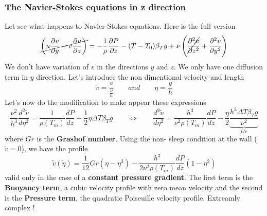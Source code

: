 	\subsubsection{The Navier-Stokes equations in z direction}
		Let see what happens to Navier-Stokes equations. Here is the full version 
		\begin{equation}
			\cancel{\left( u\frac{\D v}{\D y} + v\frac{\D v}{\D z} \right)} = - \frac{1}{\rho} \frac{\D P}{\D z} - (T-T_0)\beta _T g + \nu \left( \cancel{\frac{\D ^2 v}{\D z^2}} + \frac{\D ^2 v}{\D y^2} \right)
		\end{equation}
		We don’t have variation of $v$ in the directions $y$ and $z$. We only have one diffusion term in $y$ direction. Let's introduce the non dimentional velocity and length
		\begin{equation}
			\tilde{v} = \frac{v}{\frac{\nu}{h}} \qquad and \qquad \eta = \frac{y}{h}
		\end{equation}
	 	Let's now do the modification to make appear these expressions
	 	\begin{equation}
	 		\frac{\nu ^2}{h^3} \frac{d^2 \tilde{v}}{d \eta ^2} = \frac{1}{\rho (T_m)} \frac{dP}{dz} - \frac{1}{2} \eta \Delta T \beta _T g \qquad \Leftrightarrow \qquad 
	 		\frac{d^2 \tilde{v}}{d \eta ^2} = \frac{h^3}{\nu ^2\rho (T_m)} \frac{dP}{dz} - \frac{\eta}{2} \underbrace{\frac{h^3 \Delta T \beta _T g}{\nu ^2}}_{Gr}
	 	\end{equation}
		where $Gr$ is the \textbf{Grashof number}. Using the non-		sleep condition at the wall ($\tilde{v} = 0$), we have the 	profile 
		\begin{equation}
			\tilde{v} (\tilde{\eta}) = \frac{1}{12} Gr (\eta - \eta ^3) - \frac{h^3}{2\nu ^2\rho (T_m)} \frac{dP}{dz} (1-\eta ^2)
		\end{equation}
		valid only in the case of a \textbf{constant pressure gradient}. The first term is the \textbf{Buoyancy term}, a cubic velocity profile with zero mean velocity and the second is the \textbf{Pressure term}, the quadratic Poiseuille velocity profile. Extreamly complex ! 
		
